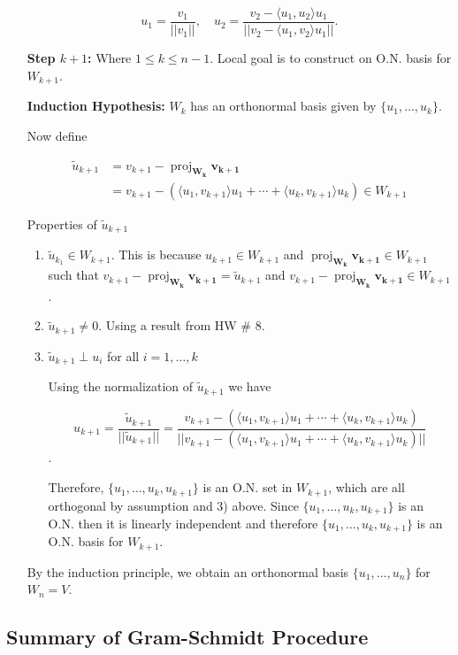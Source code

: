 \documentclass[12pt]{article}
\DeclareMathOperator{\proj}{proj}
\newcommand{\vct}{\mathbf}
\newcommand{\vctproj}[2][]{\proj_{\vct{#1}}\vct{#2}}
\theoremstyle{definition}
\begin{document}
\begin{itemize}
\[ u_1 = \frac{v_1}{||v_1||}, \quad
u_2 = \frac{v_2 - \langle u_1, u_2 \rangle u_1}{||v_2 - \langle u_1, v_2 \rangle u_1 ||}. \]
\item[\textbf{Step $k + 1$:}] Where $1 \leq k \leq n-1$.
Local goal is to construct on O.N. basis for $W_{k+1}$.

\noindent \textbf{Induction Hypothesis:} $W_k$ has an orthonormal basis given by
$\{ u_1, \ldots, u_k \}$.

Now define

\begin{align*}
\widetilde{u}_{k+1} &= v_{k+1} - \vctproj[W_k]{v_{k+1}} \\
&= v_{k+1} - ( \langle u_1, v_{k+1} \rangle u_1 + \cdots + \langle u_k, v_{k+1} \rangle u_k) \in W_{k+1}
\end{align*}

Properties of $\widetilde{u}_{k+1}$
\begin{enumerate}[label = (\arabic*)]
\item $\widetilde{u}_{k_1} \in W_{k+1}$. This is because $u_{k+1} \in W_{k+1}$ and $\vctproj[W_k]{v_{k+1}} \in W_{k+1}$
such that $v_{k+1} - \vctproj[W_k]{v_{k+1}} = \widetilde{u}_{k+1}$ and $v_{k+1} - \vctproj[W_k]{v_{k+1}} \in W_{k+1}$.

\item $\widetilde{u}_{k+1} \neq 0$. Using a result from HW \# 8.

\item $\widetilde{u}_{k+1} \perp u_i$ for all $i = 1, \ldots, k$

Using the normalization of $\widetilde{u}_{k+1}$ we have

\[
u_{k+1} = \frac{\widetilde{u}_{k+1}}{|| \widetilde{u}_{k+1} ||} =
\frac{v_{k+1} - (\langle u_1, v_{k+1} \rangle u_1 + \cdots + \langle u_k, v_{k+1} \rangle u_k )}
{|| v_{k+1} - (\langle u_1, v_{k+1} \rangle u_1 + \cdots + \langle u_k, v_{k+1} \rangle u_k ) ||}
\].

Therefore, $\{u_1, \ldots, u_k, u_{k+1}\}$ is an O.N. set in $W_{k+1}$, which are all
orthogonal by assumption and 3) above. Since $\{u_1, \ldots, u_k, u_{k+1}\}$ is
an O.N. then it is linearly independent and therefore $\{u_1, \ldots, u_k, u_{k+1}\}$
is an O.N. basis for $W_{k+1}$.
\end{enumerate}

By the induction principle, we obtain an orthonormal basis $\{u_1, \ldots, u_n\}$ for $W_n = V$.
\end{itemize}

\subsection{Summary of Gram-Schmidt Procedure}
\end{document}
